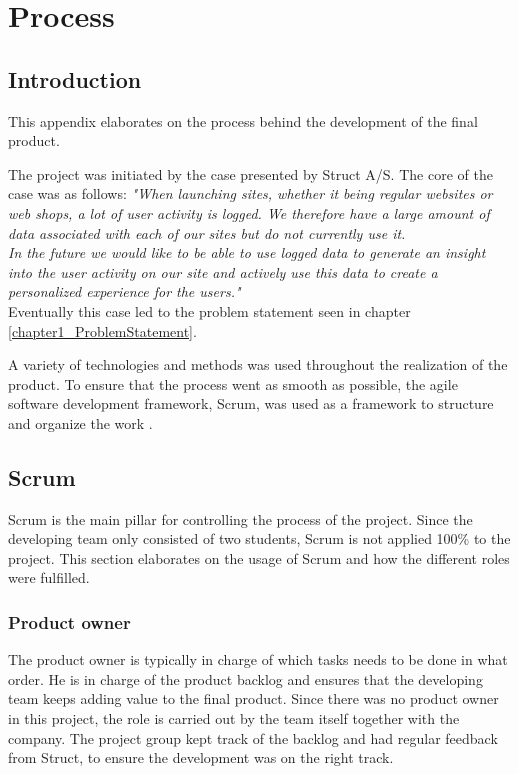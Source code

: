 
\chapter{Process} %

\label{Appendix D} %


\section{Introduction}
This appendix elaborates on the process behind the development of the final product.

The project was initiated by the case presented by Struct A/S. The core of the case was as follows:
\textit{"When launching sites, whether it being regular websites or web shops, a lot of user activity is logged. We therefore have a large amount of data associated with each of our sites but do not currently use it.} \\
\textit{In the future we would like to be able to use logged data to generate an insight into the user activity on our site and actively use this data to create a personalized experience for the users."} \\
Eventually this case led to the problem statement seen in chapter \ref{chapter1_ProblemStatement}.

A variety of technologies and methods was used throughout the realization of the product. To ensure that the process went as smooth as possible, the agile software development framework, Scrum, was used as a framework to structure and organize the work \cite{Scrum}.

\section{Scrum}
Scrum is the main pillar for controlling the process of the project. Since the developing team only consisted of two students, Scrum is not applied 100\% to the project. This section elaborates on the usage of Scrum and how the different roles were fulfilled.

\subsection{Product owner}
The product owner is typically in charge of which tasks needs to be done in what order. He is in charge of the product backlog and ensures that the developing team keeps adding value to the final product. Since there was no product owner in this project, the role is carried out by the team itself together with the company. The project group kept track of the backlog and had regular feedback from Struct, to ensure the development was on the right track.

